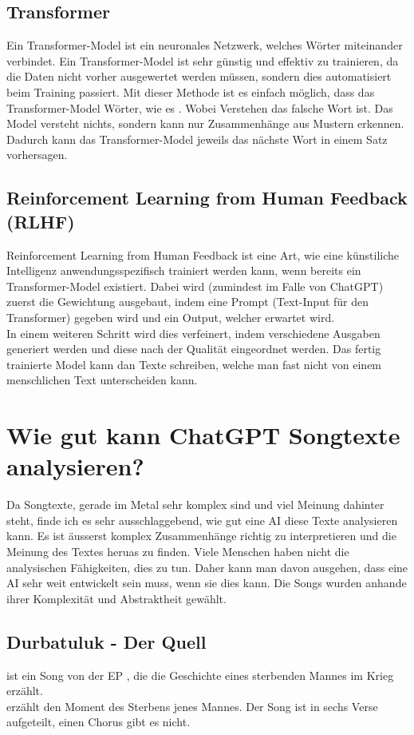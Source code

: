 \documentclass[twocolumn,10pt]{article}
\begin{document}
	\subsection{Transformer}
	Ein Transformer-Model ist ein neuronales Netzwerk, welches Wörter miteinander verbindet. Ein Transformer-Model ist sehr günstig und effektiv zu trainieren, da die Daten nicht vorher ausgewertet werden müssen, sondern dies automatisiert beim Training passiert. Mit dieser Methode ist es einfach möglich, dass das Transformer-Model Wörter, wie es . Wobei Verstehen das falsche Wort ist. Das Model versteht nichts, sondern kann nur Zusammenhänge aus Mustern erkennen. Dadurch kann das Transformer-Model jeweils das nächste Wort in einem Satz vorhersagen.
	\subsection{Reinforcement Learning from Human Feedback (RLHF)}
	Reinforcement Learning from Human Feedback ist eine Art, wie eine künstiliche Intelligenz anwendungsspezifisch trainiert werden kann, wenn bereits ein Transformer-Model existiert. Dabei wird (zumindest im Falle von ChatGPT) zuerst die Gewichtung ausgebaut, indem eine Prompt (Text-Input für den Transformer) gegeben wird und ein Output, welcher erwartet wird.\\
	In einem weiteren Schritt wird dies verfeinert, indem verschiedene Ausgaben generiert werden und diese nach der Qualität eingeordnet werden. Das fertig trainierte Model kann dan Texte schreiben, welche man fast nicht von einem menschlichen Text unterscheiden kann.
	
	\pagebreak
	\section{Wie gut kann ChatGPT Songtexte analysieren?}
		Da Songtexte, gerade im Metal sehr komplex sind und viel Meinung dahinter steht, finde ich es sehr ausschlaggebend, wie gut eine AI diese Texte analysieren kann. Es ist äusserst komplex Zusammenhänge richtig zu interpretieren und die Meinung des Textes heruas zu finden. Viele Menschen haben nicht die analysischen Fähigkeiten, dies zu tun. Daher kann man davon ausgehen, dass eine AI sehr weit entwickelt sein muss, wenn sie dies kann. Die Songs wurden anhande ihrer Komplexität und Abstraktheit gewählt.
		\subsection{Durbatuluk - Der Quell}
			 ist ein Song von der EP , die die Geschichte eines sterbenden Mannes im Krieg erzählt.\cite{Mail}\\
			 erzählt den Moment des Sterbens jenes Mannes. Der Song ist in sechs Verse aufgeteilt, einen Chorus gibt es nicht.
\end{document}
